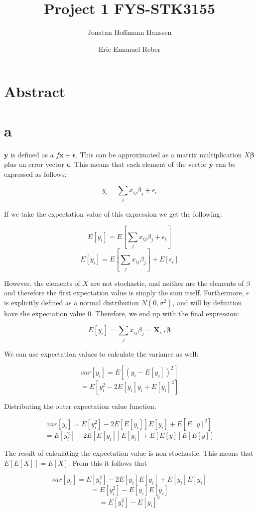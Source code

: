 \documentclass{article}
\author{Jonatan Hoffmann Hanssen \and Eric Emanuel Reber}
\title{Project 1 FYS-STK3155}
\begin{document}
	\maketitle

\section*{Abstract}

\section*{a}

$\bm{y}$ is defined as a $f\bm{x} + \bm{\epsilon}$. This can be approximated as a matrix multiplication $X\bm{\beta}$
plus an error vector $\bm{\epsilon}$. This means that each element of the vector
$\bm{y}$ can be expressed as follows:

\[ y_i = \sum_j x_{ij}\beta_j + \epsilon_i \]

If we take the expectation value of this expression we get the following:

\[ E[y_i] = E\left[\sum_j x_{ij}\beta_j + \epsilon_i\right] \]
\[ E[y_i] = E\left[\sum_j x_{ij}\beta_j\right] + E[\epsilon_i] \]

However, the elements of $X$ are not stochastic, and neither are the elements of $\beta$
and therefore
the first expectation value is simply the sum itself. Furthermore, $\epsilon$ is 
explicitly defined as a normal distribution $N(0,\sigma^2)$, and will by definition have
the expectation value $0$. Therefore, we end up with the final expression:

\[ E[y_i] = \sum_j x_{ij}\beta_j = \bm{X}_{i,*}\bm{\beta}\]

We can use expectation values to calculate the variance as well:

\[ var[y_i] = E\left[(y_i - E[y_i])^2\right] \]
\[ = E\left[y_i^2 - 2E[y_i]y_i + E[y_i]^2\right] \]

Distributing the outer expectation value function:

\[ var[y_i] = E[y_i^2] - 2E\left[E[y_i]\right]E[y_i] + E\left[E[y]^2\right] \]
\[ = E[y_i^2] - 2E\left[E[y_i]\right]E[y_i] + E\left[E[y]\right]E\left[E[y]\right] \]

The result of calculating the expectation value is non-stochastic. This means that
$E[E[X]] = E[X]$. From this it follows that

\[ var[y_i] = E[y_i^2] - 2E[y_i]E[y_i] + E[y_i]E[y_i] \]
\[ = E[y_i^2] - E[y_i]E[y_i] \]
\[ = E[y_i^2] - E[y_i]^2 \]
\end{document}

